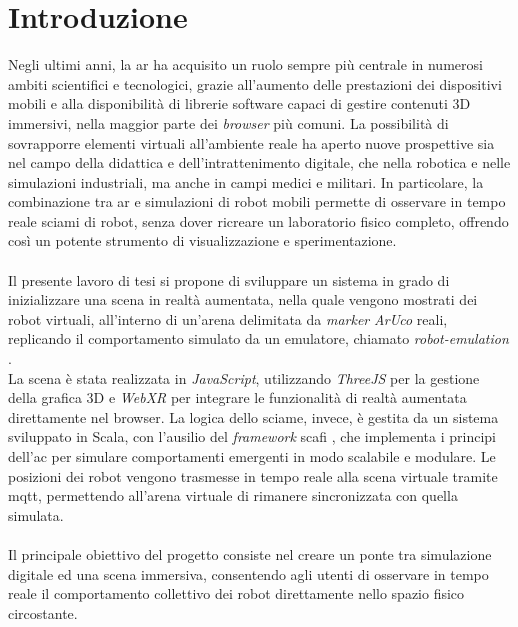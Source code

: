\documentclass[12pt,a4paper,openright,oneside]{book}
\begin{document}
\chapter{Introduzione}\label{chap:introduzione}
Negli ultimi anni, la \ac{ar} ha acquisito un ruolo sempre più centrale in numerosi ambiti scientifici e tecnologici, grazie all’aumento delle prestazioni dei dispositivi mobili e alla disponibilità di librerie software capaci di gestire contenuti 3D immersivi, nella maggior parte dei \textit{browser} più comuni.
La possibilità di sovrapporre elementi virtuali all’ambiente reale ha aperto nuove prospettive sia nel campo della didattica e dell'intrattenimento digitale, che nella robotica e nelle simulazioni industriali, ma anche in campi medici e militari.
In particolare, la combinazione tra \ac{ar} e simulazioni di robot mobili permette di osservare in tempo reale sciami di robot, senza dover ricreare un laboratorio fisico completo, offrendo così un potente strumento di visualizzazione e sperimentazione.
\\
\\
Il presente lavoro di tesi si propone di sviluppare un sistema in grado di inizializzare una scena in realtà aumentata, nella quale vengono mostrati dei robot virtuali, all’interno di un’arena delimitata da \textit{marker} \textit{ArUco} \cite{aruco-1} \cite{aruco-2} reali, replicando il comportamento simulato da un emulatore, chiamato \textit{robot-emulation} \cite{robot-emulation}.
\\
La scena è stata realizzata in \textit{JavaScript}, utilizzando \textit{ThreeJS} \cite{threejs} per la gestione della grafica 3D e \textit{WebXR} \cite{webxr} per integrare le funzionalità di realtà aumentata direttamente nel browser.
La logica dello sciame, invece, è gestita da un sistema sviluppato in Scala, con l'ausilio del \textit{framework} \ac{scafi} \cite{scafi}, che implementa i principi dell’\ac{ac} \cite{ac} per simulare comportamenti emergenti in modo scalabile e modulare.
Le posizioni dei robot vengono trasmesse in tempo reale alla scena virtuale tramite \ac{mqtt}, permettendo all'arena virtuale di rimanere sincronizzata con quella simulata.
\\
\\
Il principale obiettivo del progetto consiste nel creare un ponte tra simulazione digitale ed una scena immersiva, consentendo agli utenti di osservare in tempo reale il comportamento collettivo dei robot direttamente nello spazio fisico circostante.
\end{document}

